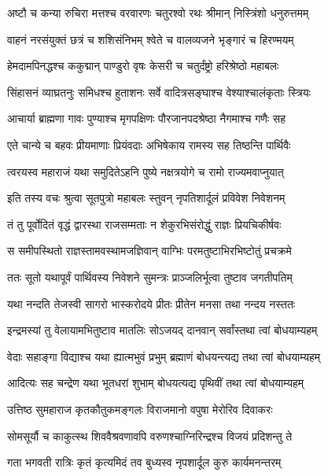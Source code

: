 \twolineshloka
{अष्टौ च कन्या रुचिरा मत्तश्च वरवारणः}
{चतुरश्वो रथः श्रीमान् निस्त्रिंशो धनुरुत्तमम्} %

\twolineshloka
{वाहनं नरसंयुक्तं छत्रं च शशिसंनिभम्}
{श्वेते च वालव्यजने भृङ्गारं च हिरण्मयम्} %

\twolineshloka
{हेमदामपिनद्धश्च ककुद्मान् पाण्डुरो वृषः}
{केसरी च चतुर्दंष्ट्रो हरिश्रेष्ठो महाबलः} %

\twolineshloka
{सिंहासनं व्याघ्रतनुः समिधश्च हुताशनः}
{सर्वे वादित्रसङ्घाश्च वेश्याश्चालंकृताः स्त्रियः} %

\twolineshloka
{आचार्या ब्राह्मणा गावः पुण्याश्च मृगपक्षिणः}
{पौरजानपदश्रेष्ठा नैगमाश्च गणैः सह} %

\twolineshloka
{एते चान्ये च बहवः प्रीयमाणाः प्रियंवदाः}
{अभिषेकाय रामस्य सह तिष्ठन्ति पार्थिवैः} %

\twolineshloka
{त्वरयस्व महाराजं यथा समुदितेऽहनि}
{पुष्ये नक्षत्रयोगे च रामो राज्यमवाप्नुयात्} %

\twolineshloka
{इति तस्य वचः श्रुत्वा सूतपुत्रो महाबलः}
{स्तुवन् नृपतिशार्दूलं प्रविवेश निवेशनम्} %

\twolineshloka
{तं तु पूर्वोदितं वृद्धं द्वारस्था राजसम्मताः}
{न शेकुरभिसंरोद्धुं राज्ञः प्रियचिकीर्षवः} %

\twolineshloka
{स समीपस्थितो राज्ञस्तामवस्थामजज्ञिवान्}
{वाग्भिः परमतुष्टाभिरभिष्टोतुं प्रचक्रमे} %

\twolineshloka
{ततः सूतो यथापूर्वं पार्थिवस्य निवेशने}
{सुमन्त्रः प्राञ्जलिर्भूत्वा तुष्टाव जगतीपतिम्} %

\twolineshloka
{यथा नन्दति तेजस्वी सागरो भास्करोदये}
{प्रीतः प्रीतेन मनसा तथा नन्दय नस्ततः} %

\twolineshloka
{इन्द्रमस्यां तु वेलायामभितुष्टाव मातलिः}
{सोऽजयद् दानवान् सर्वांस्तथा त्वां बोधयाम्यहम्} %

\twolineshloka
{वेदाः सहाङ्गा विद्याश्च यथा ह्यात्मभुवं प्रभुम्}
{ब्रह्माणं बोधयन्त्यद्य तथा त्वां बोधयाम्यहम्} %

\twolineshloka
{आदित्यः सह चन्द्रेण यथा भूतधरां शुभाम्}
{बोधयत्यद्य पृथिवीं तथा त्वां बोधयाम्यहम्} %

\twolineshloka
{उत्तिष्ठ सुमहाराज कृतकौतुकमङ्गलः}
{विराजमानो वपुषा मेरोरिव दिवाकरः} %

\twolineshloka
{सोमसूर्यौ च काकुत्स्थ शिववैश्रवणावपि}
{वरुणश्चाग्निरिन्द्रश्च विजयं प्रदिशन्तु ते} %

\twolineshloka
{गता भगवती रात्रिः कृतं कृत्यमिदं तव}
{बुध्यस्व नृपशार्दूल कुरु कार्यमनन्तरम्} %

